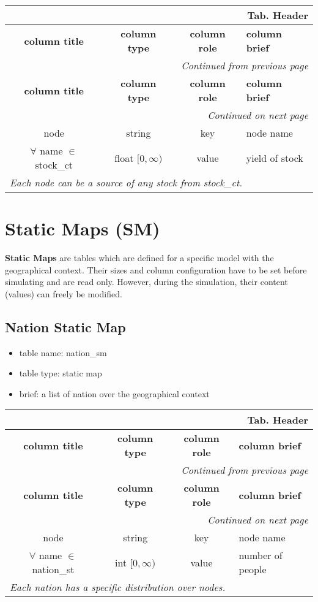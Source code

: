 \documentclass[a4paper,oneside,titlepage]{report}
\newcommand*{\LTHeaderIV}[5]{
  \multicolumn{4}{r}{\textbf{Tab. \thesubsection} \textbf{#1}}\\    
  \hline
  \textbf{#2} & \textbf{#3} & \textbf{#4} & \textbf{#5}\\
  \hline
  
  \endfirsthead
  \multicolumn{4}{r}{\textit{Continued from previous page}}\\    
  \hline
  \textbf{#2} & \textbf{#3} & \textbf{#4} & \textbf{#5}\\
  \hline
  \endhead
  \hline
  \multicolumn{4}{r}{\textit{Continued on next page}}\\
  \endfoot
  \hline
  \endlastfoot  
}
\begin{document}
\begin{longtable}{ |c|c|c|l| } 
  \LTHeaderIV{Header}{column title}{column type}{column role}{column brief}                    
  node & string & key & node name\\
  $\forall$ name $\in$ stock\_ct & float $[0, \infty)$ & value & yield of stock \\
  \multicolumn{4}{|l|}{\textit{Each node can be a source of any stock from stock\_ct.}}\\
\end{longtable}        

\section{Static Maps (SM)}
\textbf{Static Maps} are tables which are defined for a specific model with the geographical context. Their sizes and column configuration have to be set before simulating and are read only. However, during the simulation, their content (values) can freely be modified.

\subsection{Nation Static Map}
\begin{itemize}
  \setlength{\itemsep}{0pt}
  \setlength{\parskip}{0pt}
\item table name: nation\_sm  
\item table type: static map  
\item brief: a list of nation over the geographical context
\end{itemize}

\begin{longtable}{ |c|c|c|l| } 
  \LTHeaderIV{Header}{column title}{column type}{column role}{column brief}                    
  node & string & key & node name\\
  $\forall$ name $\in$ nation\_st & int $[0, \infty)$ & value & number of people \\
  \multicolumn{4}{|l|}{\textit{Each nation has a specific distribution over nodes.}}\\
\end{longtable}        

\end{document}
